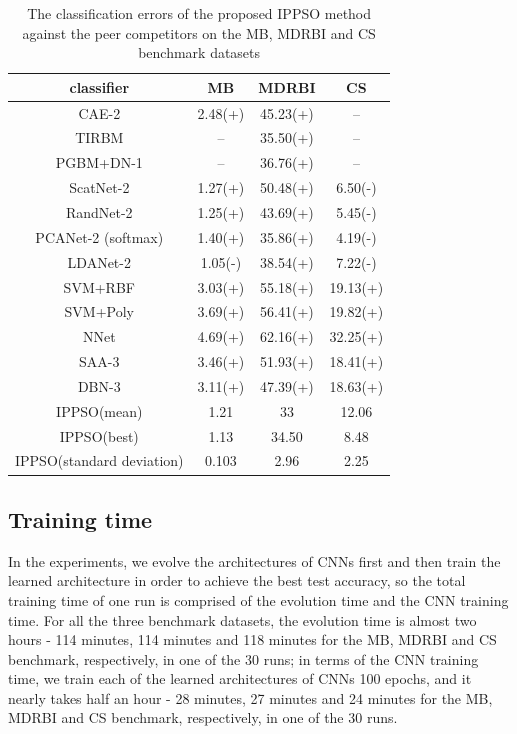 \documentclass[conference]{IEEEtran}
\begin{document}
\begin{table}[!t]
	\renewcommand{\arraystretch}{1.3}
	\caption{The classification errors of the proposed IPPSO method against the peer competitors on the MB, MDRBI and CS benchmark datasets}
	\label{table:ResultComparison}
	\centering
	\begin{tabular}{|c|c|c|c|}
		\hline
		classiﬁer & MB & MDRBI & CS\\
		\hline
		CAE-2 & 2.48(+) & 45.23(+) & --\\
		\hline
		TIRBM & -- & 35.50(+) & --\\
		\hline
		PGBM+DN-1 & -- & 36.76(+) & --\\
		\hline
		ScatNet-2 & 1.27(+) & 50.48(+) & 6.50(-)\\
		\hline
		RandNet-2 & 1.25(+) & 43.69(+) & 5.45(-)\\
		\hline
		PCANet-2 (softmax)  & 1.40(+) & 35.86(+) & 4.19(-)\\
		\hline
		LDANet-2 & 1.05(-) & 38.54(+) & 7.22(-)\\
		\hline
		SVM+RBF & 3.03(+) & 55.18(+) & 19.13(+)\\
		\hline
		SVM+Poly & 3.69(+) & 56.41(+) & 19.82(+)\\
		\hline
		NNet & 4.69(+) & 62.16(+) & 32.25(+)\\
		\hline
		SAA-3 & 3.46(+) & 51.93(+) & 18.41(+)\\
		\hline
		DBN-3  & 3.11(+) & 47.39(+) & 18.63(+)\\
		\hline
		IPPSO(mean) & 1.21 & 33 & 12.06\\
		\hline
		IPPSO(best) & 1.13 & 34.50 & 8.48\\
		\hline
		IPPSO(standard deviation) & 0.103 & 2.96 & 2.25\\
		\hline
	\end{tabular}
\end{table}

\subsection{Training time}\label{sec:TrainingTime}

In the experiments, we evolve the architectures of CNNs first and then train the learned architecture in order to achieve the best test accuracy, so the total training time of one run is comprised of the evolution time and the CNN training time. For all the three benchmark datasets, the evolution time is almost two hours - 114 minutes, 114 minutes and 118 minutes for the MB, MDRBI and CS benchmark, respectively, in one of the 30 runs; in terms of the CNN training time, we train each of the learned architectures of CNNs 100 epochs, and it nearly takes half an hour - 28 minutes, 27 minutes and 24 minutes for the MB, MDRBI and CS benchmark, respectively, in one of the 30 runs. 
\end{document}
